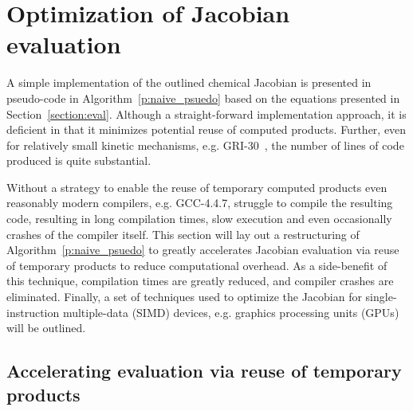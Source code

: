 \documentclass[preprint,12pt]{elsarticle}
\begin{document}
\section{Optimization of Jacobian evaluation}

A simple implementation of the outlined chemical Jacobian is presented in pseudo-code in Algorithm~\eqref{p:naive_psuedo} based on the equations presented in Section~\ref{section:eval}.  
Although a straight-forward implementation approach, it is deficient in that it minimizes potential reuse of computed products.
Further, even for relatively small kinetic mechanisms, e.g. GRI-30~\cite{smith_gri-mech_30}, the number of lines of code produced is quite substantial.

Without a strategy to enable the reuse of temporary computed products even reasonably modern compilers, e.g. GCC-4.4.7, struggle to compile the resulting code, resulting in long compilation times, slow execution and even occasionally crashes of the compiler itself.
This section will lay out a restructuring of Algorithm~\ref{p:naive_psuedo} to greatly accelerates Jacobian evaluation via reuse of temporary products to reduce computational overhead.
As a side-benefit of this technique, compilation times are greatly reduced, and compiler crashes are eliminated.
Finally, a set of techniques used to optimize the Jacobian for single-instruction multiple-data (SIMD) devices, e.g. graphics processing units (GPUs) will be outlined.

\subsection{Accelerating evaluation via reuse of temporary products}
\end{document}

